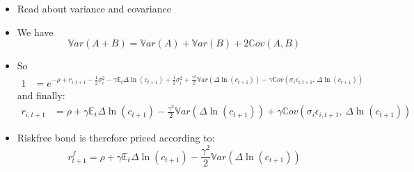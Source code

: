 \documentclass[10pt]{beamer}
\begin{document}
\begin{frame}{}
\begin{itemize}
\item Read about variance and covariance

\item We have 
\begin{equation*}
	\mathbb Var (A + B) = \mathbb Var (A) +  \mathbb Var (B) + 2 \mathbb Cov (A, B)
\end{equation*}

\item So
\begin{align*}
	1 &= e^{- \rho + r_{i, t+1} - \frac{1}{2} \sigma_i^2 - \gamma \mathbb{E}_t \Delta \ln(c_{t+1}) + \frac{1}{2} \sigma_i^2 + \frac{\gamma^2}{2} \mathbb Var(\Delta \ln(c_{t+1}) ) - \gamma \mathbb Cov(\sigma_i \epsilon_{i, t+1}, \, \Delta \ln(c_{t+1})) }
\end{align*}
and finally:
\begin{align*}
	r_{i, t+1} &= \rho + \gamma \mathbb{E}_t \Delta \ln(c_{t+1}) - \frac{\gamma^2}{2} \mathbb Var(\Delta \ln(c_{t+1}) ) + \gamma \mathbb Cov(\sigma_i \epsilon_{i, t+1}, \, \Delta \ln(c_{t+1}))
\end{align*}

\item Riskfree bond is therefore priced according to:
\begin{equation*}
	r_{t+1}^f = \rho + \gamma \mathbb{E}_t \Delta \ln(c_{t+1}) - \frac{\gamma^2}{2} \mathbb Var(\Delta \ln(c_{t+1}) )
\end{equation*}
\end{itemize}
\end{frame}
\end{document}

